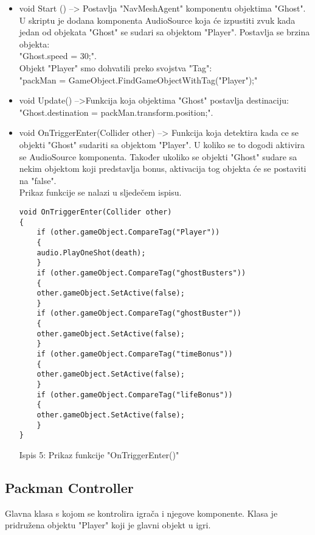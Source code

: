 \begin{itemize}
	
\item void Start () --> Postavlja "NavMeshAgent" komponentu objektima "Ghost". U skriptu je dodana komponenta AudioSource koja će izpustiti zvuk kada jedan od objekata "Ghost" se sudari sa objektom "Player".
Postavlja se brzina objekta: \\"Ghost.speed = 30;".\\
Objekt "Player" smo dohvatili preko svojstva "Tag":\\ 
"packMan = GameObject.FindGameObjectWithTag("Player");"

\item void Update() -->Funkcija koja objektima "Ghost" postavlja destinaciju:\\ "Ghost.destination = packMan.transform.position;".

\item void OnTriggerEnter(Collider other) --> Funkcija koja detektira kada ce se objekti "Ghost" sudariti sa objektom "Player". U koliko se to dogodi aktivira se AudioSource komponenta. Također ukoliko se objekti "Ghost" sudare sa nekim objektom koji predstavlja bonus, aktivacija tog objekta će se postaviti na "false".\\ Prikaz funkcije se nalazi u sljedečem ispisu.

\begin{verbatim}
void OnTriggerEnter(Collider other)
{
	if (other.gameObject.CompareTag("Player"))
	{
	audio.PlayOneShot(death);
	}
	if (other.gameObject.CompareTag("ghostBusters"))
	{
	other.gameObject.SetActive(false);
	}
	if (other.gameObject.CompareTag("ghostBuster"))
	{
	other.gameObject.SetActive(false);
	}
	if (other.gameObject.CompareTag("timeBonus"))
	{
	other.gameObject.SetActive(false);
	}
	if (other.gameObject.CompareTag("lifeBonus"))
	{
	other.gameObject.SetActive(false);
	}
}

\end{verbatim}
\begin{center}
	
	Ispis 5: Prikaz funkcije "OnTriggerEnter()"
\end{center}

\end{itemize}

\subsection{Packman Controller}
Glavna klasa s kojom se kontrolira igrača i njegove komponente. Klasa je pridružena objektu "Player" koji je glavni objekt u igri. 

